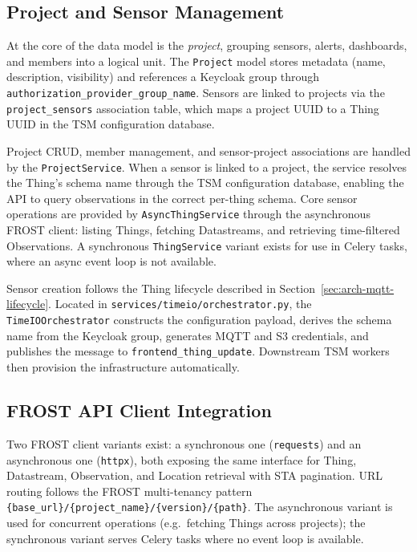 \subsection{Project and Sensor Management}
\label{sec:impl-backend-projects}

At the core of the data model is the \emph{project}, grouping sensors, alerts, dashboards, and
members into a logical unit. The \texttt{Project} model stores metadata (name, description,
visibility) and references a Keycloak group through \texttt{authorization\_provider\_group\_name}.
Sensors are linked to projects via the \texttt{project\_sensors} association table, which maps
a project UUID to a Thing UUID in the TSM configuration database.

Project CRUD, member management, and sensor-project
associations are handled by the \texttt{ProjectService}. When a sensor is linked to a project, the service resolves the Thing's schema
name through the TSM configuration database, enabling the API to query observations in the
correct per-thing schema. Core sensor operations are provided by \texttt{AsyncThingService}
through the asynchronous FROST client: listing Things, fetching Datastreams, and retrieving
time-filtered Observations. A synchronous \texttt{ThingService} variant exists for use in
Celery tasks, where an async event loop is not available.

Sensor creation follows the Thing lifecycle described in Section~\ref{sec:arch-mqtt-lifecycle}.
Located in \texttt{services/timeio/orchestrator.py}, the \texttt{TimeIOOrchestrator} constructs the
configuration payload, derives the schema name from the Keycloak group, generates MQTT and
S3 credentials, and publishes the message to \texttt{frontend\_thing\_update}. Downstream
TSM workers then provision the infrastructure automatically.

\subsection{FROST API Client Integration}
\label{sec:impl-backend-frost}

Two FROST client variants exist: a synchronous one (\texttt{requests}) and an asynchronous
one (\texttt{httpx}), both exposing the same interface for Thing, Datastream, Observation,
and Location retrieval with STA pagination. URL routing follows the FROST multi-tenancy
pattern \texttt{\{base\_url\}/\{project\_name\}/\{version\}/\{path\}}. The
asynchronous variant is used for concurrent operations (e.g.\ fetching Things across
projects); the synchronous variant serves Celery tasks where no event loop is available.

